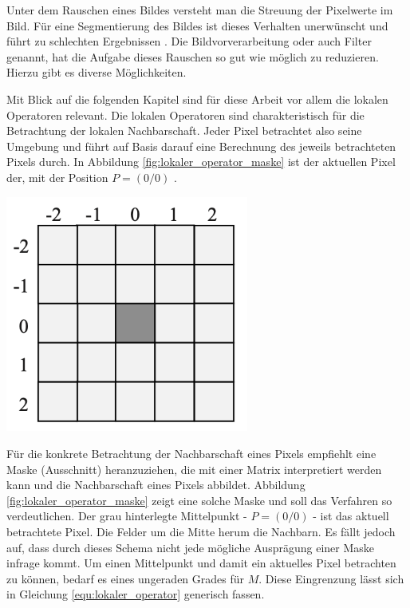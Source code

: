 Unter dem Rauschen eines Bildes versteht man die Streuung der Pixelwerte im Bild.
Für eine Segmentierung des Bildes ist dieses Verhalten unerwünscht und führt zu schlechten
Ergebnissen \citep[vgl.][S.~51]{handels2000}. Die Bildvorverarbeitung oder auch Filter
genannt, hat die Aufgabe dieses Rauschen so gut wie möglich zu reduzieren. Hierzu
gibt es diverse Möglichkeiten.

\begin{minipage}{0.40\textwidth}
	Mit Blick auf die folgenden Kapitel sind für diese Arbeit vor allem die lokalen
	Operatoren relevant. Die lokalen Operatoren sind charakteristisch für die
	Betrachtung der lokalen Nachbarschaft. Jeder Pixel betrachtet also seine Umgebung
	und führt auf Basis darauf eine Berechnung des jeweils betrachteten Pixels durch.
	In Abbildung \ref{fig:lokaler_operator_maske} ist der aktuellen Pixel der, mit
	der Position $P = (0/0)$ \citep[vgl.][S.~52]{handels2000}.
\end{minipage}
\hfill
\begin{minipage}{0.50\textwidth}
	\centering
	\includegraphics[width=0.60\textwidth]{img/lokaler_operator_maske.jpg}
	\label{fig:lokaler_operator_maske}
\end{minipage}

Für die konkrete Betrachtung der Nachbarschaft eines Pixels empfiehlt \citet[S.~52]{handels2000}
eine Maske (Ausschnitt) heranzuziehen, die mit einer Matrix interpretiert werden
kann und die Nachbarschaft eines Pixels abbildet. Abbildung \ref{fig:lokaler_operator_maske}
zeigt eine solche Maske und soll das Verfahren so verdeutlichen. Der grau
hinterlegte Mittelpunkt - $P = (0/0)$ - ist das aktuell betrachtete Pixel. Die Felder
um die Mitte herum die Nachbarn. Es fällt jedoch auf, dass durch dieses Schema nicht
jede mögliche Ausprägung einer Maske infrage kommt. Um einen Mittelpunkt und
damit ein aktuelles Pixel betrachten zu können, bedarf es eines ungeraden Grades
für $M$. Diese Eingrenzung lässt sich in Gleichung \ref{equ:lokaler_operator}
generisch fassen.

